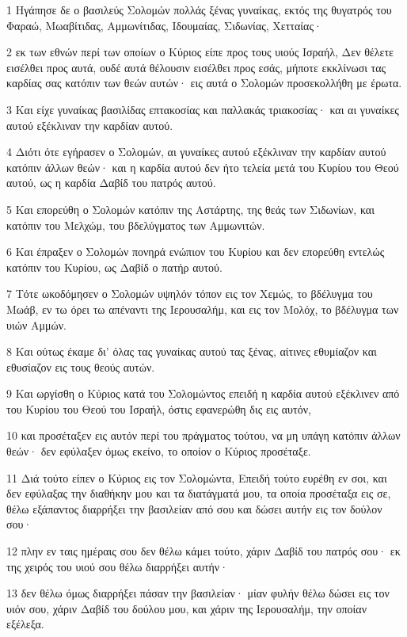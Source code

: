 \par 1 Ηγάπησε δε ο βασιλεύς Σολομών πολλάς ξένας γυναίκας, εκτός της θυγατρός του Φαραώ, Μωαβίτιδας, Αμμωνίτιδας, Ιδουμαίας, Σιδωνίας, Χετταίας·
\par 2 εκ των εθνών περί των οποίων ο Κύριος είπε προς τους υιούς Ισραήλ, Δεν θέλετε εισέλθει προς αυτά, ουδέ αυτά θέλουσιν εισέλθει προς εσάς, μήποτε εκκλίνωσι τας καρδίας σας κατόπιν των θεών αυτών· εις αυτά ο Σολομών προσεκολλήθη με έρωτα.
\par 3 Και είχε γυναίκας βασιλίδας επτακοσίας και παλλακάς τριακοσίας· και αι γυναίκες αυτού εξέκλιναν την καρδίαν αυτού.
\par 4 Διότι ότε εγήρασεν ο Σολομών, αι γυναίκες αυτού εξέκλιναν την καρδίαν αυτού κατόπιν άλλων θεών· και η καρδία αυτού δεν ήτο τελεία μετά του Κυρίου του Θεού αυτού, ως η καρδία Δαβίδ του πατρός αυτού.
\par 5 Και επορεύθη ο Σολομών κατόπιν της Αστάρτης, της θεάς των Σιδωνίων, και κατόπιν του Μελχώμ, του βδελύγματος των Αμμωνιτών.
\par 6 Και έπραξεν ο Σολομών πονηρά ενώπιον του Κυρίου και δεν επορεύθη εντελώς κατόπιν του Κυρίου, ως Δαβίδ ο πατήρ αυτού.
\par 7 Τότε ωκοδόμησεν ο Σολομών υψηλόν τόπον εις τον Χεμώς, το βδέλυγμα του Μωάβ, εν τω όρει τω απέναντι της Ιερουσαλήμ, και εις τον Μολόχ, το βδέλυγμα των υιών Αμμών.
\par 8 Και ούτως έκαμε δι' όλας τας γυναίκας αυτού τας ξένας, αίτινες εθυμίαζον και εθυσίαζον εις τους θεούς αυτών.
\par 9 Και ωργίσθη ο Κύριος κατά του Σολομώντος επειδή η καρδία αυτού εξέκλινεν από του Κυρίου του Θεού του Ισραήλ, όστις εφανερώθη δις εις αυτόν,
\par 10 και προσέταξεν εις αυτόν περί του πράγματος τούτου, να μη υπάγη κατόπιν άλλων θεών· δεν εφύλαξεν όμως εκείνο, το οποίον ο Κύριος προσέταξε.
\par 11 Διά τούτο είπεν ο Κύριος εις τον Σολομώντα, Επειδή τούτο ευρέθη εν σοι, και δεν εφύλαξας την διαθήκην μου και τα διατάγματά μου, τα οποία προσέταξα εις σε, θέλω εξάπαντος διαρρήξει την βασιλείαν από σου και δώσει αυτήν εις τον δούλον σου·
\par 12 πλην εν ταις ημέραις σου δεν θέλω κάμει τούτο, χάριν Δαβίδ του πατρός σου· εκ της χειρός του υιού σου θέλω διαρρήξει αυτήν·
\par 13 δεν θέλω όμως διαρρήξει πάσαν την βασιλείαν· μίαν φυλήν θέλω δώσει εις τον υιόν σου, χάριν Δαβίδ του δούλου μου, και χάριν της Ιερουσαλήμ, την οποίαν εξέλεξα.

